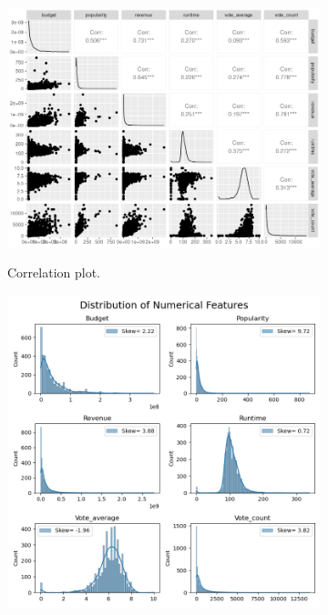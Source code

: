 \documentclass[12pt]{article}
\begin{document}

\begin{figure}[H]
\centering

\begin{subfigure}[b]{0.32\textwidth}
\centering
\includegraphics[width=1\textwidth]{images/george_viz/corr_plot.png}
\label{fig:sub1}
\caption{Correlation plot.}
\end{subfigure}
\begin{subfigure}[b]{0.33\textwidth}
\centering
\includegraphics[width=1\textwidth]{images/george_viz/numeric_distributions.png}

\end{subfigure}
\end{figure}
\end{document}
